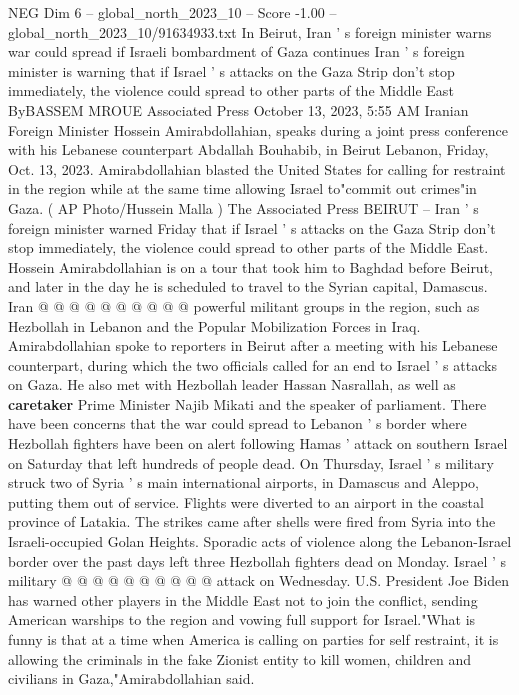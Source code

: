 \begin{textsample}{NEG Dim 6 – global\_north\_2023\_10 – Score -1.00 – global\_north\_2023\_10/91634933.txt}  \label{ex:f6_neg_252}
In Beirut, Iran ' s foreign minister warns war could spread if Israeli bombardment of Gaza continues Iran ' s foreign minister is warning that if Israel ' s attacks on the Gaza Strip don't stop immediately, the violence could spread to other parts of the Middle East ByBASSEM MROUE Associated Press October 13, 2023, 5:55 AM Iranian Foreign Minister Hossein Amirabdollahian, speaks during a joint press conference with his Lebanese counterpart Abdallah Bouhabib, in Beirut Lebanon, Friday, Oct. 13, 2023.
Amirabdollahian blasted the United States for calling for restraint in the region while at the same time allowing Israel to"commit out crimes"in Gaza. ( AP Photo/Hussein Malla ) The Associated Press BEIRUT -- Iran ' s foreign minister warned Friday that if Israel ' s attacks on the Gaza Strip don't stop immediately, the violence could spread to other parts of the Middle East.
Hossein Amirabdollahian is on a tour that took him to Baghdad before Beirut, and later in the day he is scheduled to travel to the Syrian capital, Damascus.
Iran @ @ @ @ @ @ @ @ @ @ powerful militant groups in the region, such as Hezbollah in Lebanon and the Popular Mobilization Forces in Iraq.
Amirabdollahian spoke to reporters in Beirut after a meeting with his Lebanese counterpart, during which the two officials called for an end to Israel ' s attacks on Gaza.
He also met with Hezbollah leader Hassan Nasrallah, as well as \textbf{caretaker} Prime Minister Najib Mikati and the speaker of parliament.
There have been concerns that the war could spread to Lebanon ' s border where Hezbollah fighters have been on alert following Hamas ' attack on southern Israel on Saturday that left hundreds of people dead.
On Thursday, Israel ' s military struck two of Syria ' s main international airports, in Damascus and Aleppo, putting them out of service.
Flights were diverted to an airport in the coastal province of Latakia.
The strikes came after shells were fired from Syria into the Israeli-occupied Golan Heights.
Sporadic acts of violence along the Lebanon-Israel border over the past days left three Hezbollah fighters dead on Monday.
Israel ' s military @ @ @ @ @ @ @ @ @ @ attack on Wednesday.
U.S.
President Joe Biden has warned other players in the Middle East not to join the conflict, sending American warships to the region and vowing full support for Israel."What is funny is that at a time when America is calling on parties for self restraint, it is allowing the criminals in the fake Zionist entity to kill women, children and civilians in Gaza,"Amirabdollahian said.

\end{textsample}
